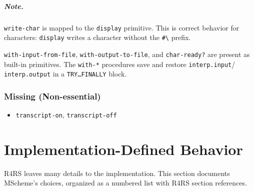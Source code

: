 \documentclass[12pt]{report}
\begin{document}
\paragraph{Note.}
{\tt write-char} is mapped to the {\tt display} primitive.  This is
correct behavior for characters: {\tt display} writes a character
without the {\tt \#\textbackslash} prefix.

\noindent
{\tt with-input-from-file}, {\tt with-output-to-file}, and
{\tt char-ready?}  are present as built-in primitives.  The
{\tt with-*} procedures save and restore {\tt interp.input}/{\tt
  interp.output} in a {\tt TRY\ldots FINALLY} block.

\subsection{Missing (Non-essential)}

\begin{itemize}[nosep]
\item {\tt transcript-on}, {\tt transcript-off}
\end{itemize}

\chapter{Implementation-Defined Behavior}
\label{sec:impl-defined}

R4RS leaves many details to the implementation.  This section
documents MScheme's choices, organized as a numbered list with R4RS
section references.
\end{document}
